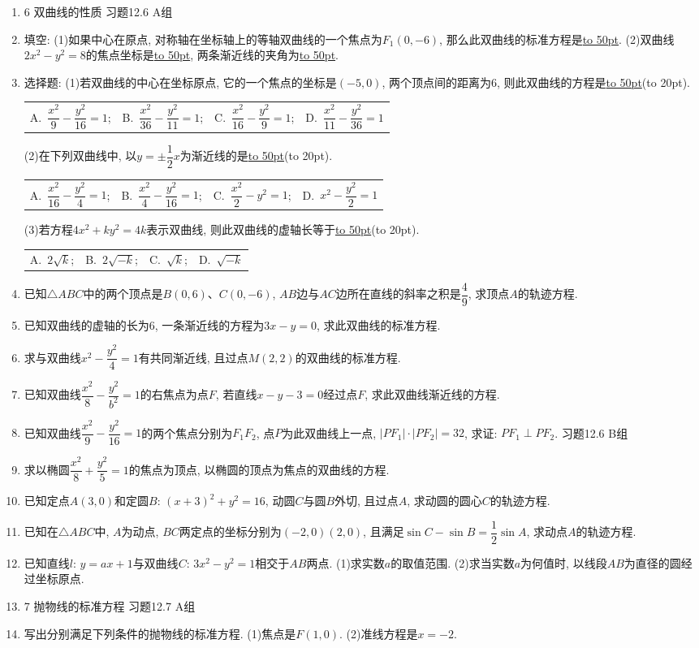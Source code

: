 \documentclass[10pt,a4paper]{article}
\newcommand{\blank}[1]{\underline{\hbox to #1pt{}}}
\newcommand{\bracket}[1]{(\hbox to #1pt{})}
\newcommand{\fourch}[4]{\par\begin{tabular}{p{.23\textwidth}p{.23\textwidth}p{.23\textwidth}p{.23\textwidth}}
A.~#1 &B.~#2& C.~#3& D.~#4
\end{tabular}}
\begin{document}
\begin{enumerate}[1.]
\item 6  双曲线的性质
习题12.6  A组
\item 填空:
(1)如果中心在原点, 对称轴在坐标轴上的等轴双曲线的一个焦点为$F_1(0,-6)$, 那么此双曲线的标准方程是\blank{50}.
(2)双曲线$2x^2-y^2=8$的焦点坐标是\blank{50}, 两条渐近线的夹角为\blank{50}.
\item 选择题:
(1)若双曲线的中心在坐标原点, 它的一个焦点的坐标是$(-5,0)$, 两个顶点间的距离为6, 则此双曲线的方程是\blank{50}\bracket{20}.
\fourch{$\dfrac{x^2}9-\dfrac{y^2}{16}=1$;}{$\dfrac{x^2}{36}-\dfrac{y^2}{11}=1$;}{$\dfrac{x^2}{16}-\dfrac{y^2}9=1$;}{$\dfrac{x^2}{11}-\dfrac{y^2}{36}=1$}
(2)在下列双曲线中, 以$y=\pm \dfrac 12x$为渐近线的是\blank{50}\bracket{20}.
\fourch{$\dfrac{x^2}{16}-\dfrac{y^2}4=1$;}{$\dfrac{x^2}4-\dfrac{y^2}{16}=1$;}{$\dfrac{x^2}2-y^2=1$;}{$x^2-\dfrac{y^2}2=1$}
(3)若方程$4x^2+ky^2=4k$表示双曲线, 则此双曲线的虚轴长等于\blank{50}\bracket{20}.
\fourch{$2\sqrt k$;}{$2\sqrt {-k}$;}{$\sqrt k$;}{$\sqrt {-k}$}
\item 已知$\triangle ABC$中的两个顶点是$B(0,6)$、$C(0,-6)$, $AB$边与$AC$边所在直线的斜率之积是$\dfrac 49$, 求顶点$A$的轨迹方程.
\item 已知双曲线的虚轴的长为6, 一条渐近线的方程为$3x-y=0$, 求此双曲线的标准方程.
\item 求与双曲线$x^2-\dfrac{y^2}4=1$有共同渐近线, 且过点$M(2,2)$的双曲线的标准方程.
\item 已知双曲线$\dfrac{x^2}8-\dfrac{y^2}{b^2}=1$的右焦点为点$F$, 若直线$x-y-3=0$经过点$F$, 求此双曲线渐近线的方程.
\item 已知双曲线$\dfrac{x^2}9-\dfrac{y^2}{16}=1$的两个焦点分别为$F_1F_2$, 点$P$为此双曲线上一点, $|PF_1|\cdot|PF_2|=32$, 求证: $PF_1\perp PF_2$.
习题12.6  B组
\item 求以椭圆$\dfrac{x^2}8+\dfrac{y^2}5=1$的焦点为顶点, 以椭圆的顶点为焦点的双曲线的方程.
\item 已知定点$A(3,0)$和定圆$B$: $(x+3)^2+y^2=16$, 动圆$C$与圆$B$外切, 且过点$A$, 求动圆的圆心$C$的轨迹方程.
\item 已知在$\triangle ABC$中, $A$为动点, $BC$两定点的坐标分别为$(-2,0)(2,0)$, 且满足$\sin C-\sin B=\dfrac 12\sin A$, 求动点$A$的轨迹方程.
\item 已知直线$l$: $y=ax+1$与双曲线$C$: $3x^2-y^2=1$相交于$AB$两点.
(1)求实数$a$的取值范围.
(2)求当实数$a$为何值时, 以线段$AB$为直径的圆经过坐标原点.
\item 7  抛物线的标准方程
习题12.7  A组
\item 写出分别满足下列条件的抛物线的标准方程.
(1)焦点是$F(1,0)$.
(2)准线方程是$x=-2$.

\end{enumerate}
\end{document}

